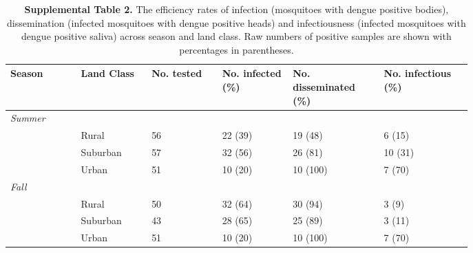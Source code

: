 \documentclass[12pt]{article}
\begin{document}
\begin{landscape}
\begin{table}[h]
\centering
\begin{tabular}{P{0.12\linewidth}P{0.12\linewidth}P{0.12\linewidth}P{0.12\linewidth}P{0.15\linewidth}P{0.15\linewidth}}
\hline
\textbf{Season} & \textbf{Land Class} & \textbf{No. tested} & \textbf{No. infected (\%)}  & \textbf{No. disseminated (\%)} & \textbf{No. infectious (\%)} \\
\hline
\hline
\textit{Summer} &   &   &   &   \\
     & Rural & 56 & 22 (39) & 19 (48) & 6 (15) \\
   & Suburban & 57 & 32 (56) & 26 (81) & 10 (31) \\
   & Urban & 51 & 10 (20) & 10 (100) & 7 (70) \\

\textit{Fall} &   &   &   &   \\
     & Rural & 50 & 32 (64) & 30 (94) & 3 (9) \\
   & Suburban & 43 & 28 (65) & 25 (89) & 3 (11) \\
   & Urban & 51 & 10 (20) & 10 (100) & 7 (70) \\
\hline
\end{tabular}
\caption{\textbf{Supplemental Table 2.} The efficiency rates of infection (mosquitoes with dengue positive bodies), dissemination (infected mosquitoes with dengue positive heads) and infectiousness (infected mosquitoes with dengue positive saliva) across season and land class. Raw numbers of positive samples are shown with percentages in parentheses.}
\end{table}

\end{landscape}
\end{document}
